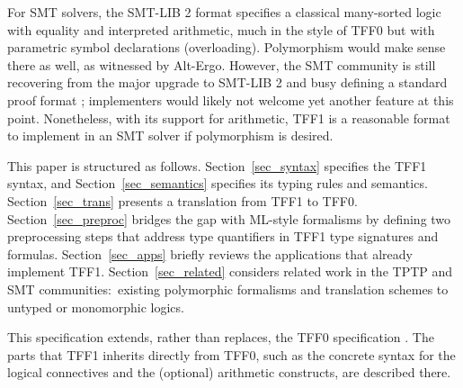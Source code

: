 For SMT solvers, the SMT-LIB 2 format \cite{barrett-et-al-2010} specifies a
classical many-sorted logic with equality and interpreted arithmetic, much in
the style of TFF0 but with parametric symbol declarations (overloading).
Polymorphism would make sense there as well, as witnessed by Alt-Ergo.
However, the SMT community is still recovering from the major
upgrade to SMT-LIB 2 and busy defining a standard proof format
\cite{besson-et-al-2011}; implementers would likely not welcome yet another
feature at this point. Nonetheless, with its support for arithmetic, TFF1 is a
reasonable format to implement in an SMT solver if polymorphism is desired.

\newcommand\cheat{\vskip0.3ex} %

This paper is structured as follows.
Section~\ref{sec_syntax} specifies the TFF1 syntax, and
Section~\ref{sec_semantics} specifies its typing rules and semantics.
Section~\ref{sec_trans} presents a translation from TFF1 to TFF0.
Section~\ref{sec_preproc} bridges the gap with ML-style formalisms by defining
two preprocessing steps that address type quantifiers in TFF1 type signatures
and formulas.
Section~\ref{sec_apps} briefly reviews the applications that already implement TFF1.
Section~\ref{sec_related} considers related work in the TPTP and SMT
communities:\ existing polymorphic formalisms and translation schemes
to untyped or monomorphic logics.

This specification extends, rather than replaces, the TFF0 specification
\cite{sutcliffe-et-al-2012-tff0}. The parts
that TFF1 inherits directly from TFF0, such as the
concrete syntax for the logical connectives and the
(optional) arithmetic constructs, are described there.
